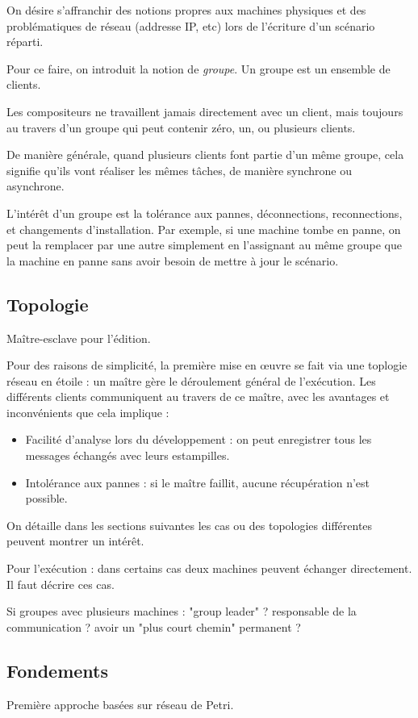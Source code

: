 \documentclass{article}
\newcommand\vocab[1]{\emph{#1}}
\begin{document}
On désire s'affranchir des notions propres aux machines physiques et des problématiques de réseau (addresse IP, etc) lors de l'écriture 
d'un scénario réparti. 

Pour ce faire, on introduit la notion de \vocab{groupe}. 
Un groupe est un ensemble de clients.

Les compositeurs ne travaillent jamais directement avec un client, mais toujours au travers d'un groupe qui peut contenir zéro, un, ou plusieurs clients.

De manière générale, quand plusieurs clients font partie d'un même groupe, cela signifie qu'ils vont réaliser les mêmes tâches, de manière synchrone ou asynchrone.

L'intérêt d'un groupe est la tolérance aux pannes, déconnections, reconnections, et changements d'installation. 
Par exemple, si une machine tombe en panne, on peut la remplacer par une autre simplement en l'assignant au même groupe que la machine en panne 
sans avoir besoin de mettre à jour le scénario.

\subsection{Topologie}
Maître-esclave pour l'édition.

Pour des raisons de simplicité, la première mise en \oe uvre se fait via une toplogie réseau en étoile : un maître gère 
le déroulement général de l'exécution. 
Les différents clients communiquent au travers de ce maître, avec les avantages et inconvénients que cela implique : 
\begin{itemize}
	\item Facilité d'analyse lors du développement : on peut enregistrer tous les messages échangés avec leurs estampilles.
	\item Intolérance aux pannes : si le maître faillit, aucune récupération n'est possible.
\end{itemize}

On détaille dans les sections suivantes les cas ou des topologies différentes peuvent montrer un intérêt.

Pour l'exécution : dans certains cas deux machines peuvent échanger directement.
Il faut décrire ces cas.

Si groupes avec plusieurs machines : "group leader" ? responsable de la communication ? avoir un "plus court chemin" permanent ?


\subsection{Fondements}
Première approche basées sur réseau de Petri.
\end{document}
